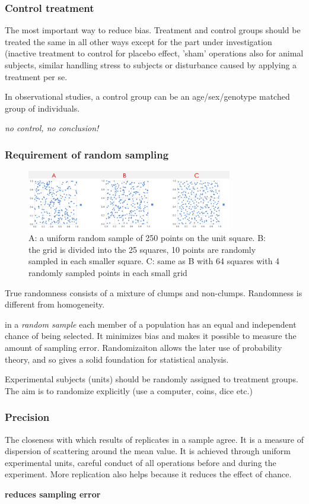 \documentclass{article}
\begin{document}
\subsubsection{Control treatment}
The most important way to reduce bias. Treatment and control groups should be treated the same in all other ways except for the part under investigation (inactive treatment to control for placebo effect, 'sham' operations also for animal subjects, similar handling stress to subjects or disturbance caused by applying a treatment per se. \par 
In observational studies, a control group can be an age/sex/genotype matched group of individuals.
\begin{center}
\textit{no control, no conclusion!}
\end{center}

\subsubsection{Requirement of random sampling}
\begin{figure}[h]
\centering
\includegraphics[width = 0.8\textwidth]{exp-design/random-sampling.png}
\caption{A: a uniform random sample of 250 points on the unit square. B: the grid is divided into the 25 squares, 10 points are randomly sampled in each smaller square. C: same as B with 64 squares with 4 randomly sampled points in each small grid}
\end{figure}
True randomness consists of a mixture of clumps and non-clumps. Randomness is different from homogeneity.\par 
in a \textit{random sample} each member of a population has an equal and independent chance of being selected. It minimizes bias and makes it possible to measure the amount of sampling error. Randomizaiton allows the later use of probability theory, and so gives a solid foundation for statistical analysis.\par 
Experimental subjects (units) should be randomly assigned to treatment groups. The aim is to randomize explicitly (use a computer, coins, dice etc.) 
\subsubsection{Precision}
The closeness with which results of replicates in a sample agree. It is a measure of dispersion of scattering around the mean value. It is achieved through uniform experimental units, careful conduct of all operations before and during the experiment. More replication also helps because it reduces the effect of chance.\par
\textbf{reduces sampling error}
\end{document}
